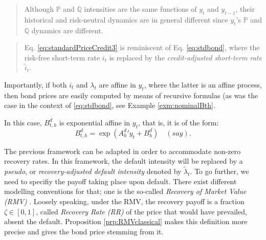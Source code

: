 \documentclass[
  12pt,
]{book}
\theoremstyle{definition}
\theoremstyle{definition}
\theoremstyle{definition}
\theoremstyle{definition}
\theoremstyle{remark}
\begin{document}
\begin{quote}
Although \(\mathbb{P}\) and \(\mathbb{Q}\) intensities are the same functions of \(y_t\) and \(y_{t-1}\), their historical and risk-neutral dynamics are in general different since \(y_t\)'s \(\mathbb{P}\) and \(\mathbb{Q}\) dynamics are different.
\end{quote}

\begin{quote}
Eq. \eqref{eq:standardPriceCredit3} is reminiscent of Eq. \eqref{eq:stdbond}, where the risk-free short-term rate \(i_t\) is replaced by the \emph{credit-adjusted short-term rate} \(\tilde{i}_t\).
\end{quote}

Importantly, if both \(i_t\) and \(\lambda_t\) are affine in \(y_t\), where the latter is an affine process, then bond prices are easily computed by means of recursive formulas (as was the case in the context of \eqref{eq:stdbond}, see Example \ref{exm:nominalBth}.

In this case, \(B_{t,h}^d\) is exponential affine in \(y_t\), that is, it is of the form:
\begin{equation}
B_{t,h}^d = \exp({A^d_h}'y_t + B^d_h)\quad (say).\label{eq:standardPriceCredit4}
\end{equation}

The previous framework can be adapted in order to accommodate non-zero recovery rates. In this framework, the default intensity will be replaced by a \emph{pseudo}, or \emph{recovery-adjusted default intensity} denoted by \(\tilde\lambda_t\). To go further, we need to specifiy the payoff taking place upon default. There exist different modelling conventions for that; one is the so-called \emph{Recovery of Market Value (RMV)} \citep{Duffie_Singleton_1999}. Loosely speaking, under the RMV, the recovery payoff is a fraction \(\zeta \in [0,1]\), called \emph{Recovery Rate (RR)} of the price that would have prevailed, absent the default. Proposition \ref{prp:RMVclassical} makes this definition more precise and gives the bond price stemming from it.
\end{document}

